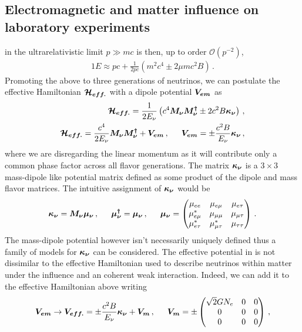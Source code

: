\subsection{Electromagnetic and matter influence on laboratory experiments}\label{rel}
\noindent{} in the ultrarelativistic limit $p\gg mc$ is then, up to order $\mathcal{O}(p^{-2})$,
\begin{alignat}{1}
	\label{eigen:3} E \approx pc + \frac{1}{2pc}\left(m^{2}c^{4}\pm2\mu mc^{2}B\right)\,.
\end{alignat}
Promoting the above to three generations of neutrinos, we can postulate the effective Hamiltonian $\boldsymbol{\mathcal{H}_{eff.}}$ with a dipole potential $\boldsymbol{V_{em}}$ as
\begin{alignat}{1}
	\label{heff:1} \bb{\mathcal{H}_{eff.}}=\frac{1}{2E_{\nu}}\left(c^{4}\bb{M_{\nu}}\bb{M_{\nu}^{\dagger}}\pm2c^{2}B\bb{\kappa_{\nu}}\right)\,,\\
	\label{heff:2} \bb{\mathcal{H}_{eff.}}=\frac{c^{4}}{2E_{\nu}}\bb{M_{\nu}}\bb{M_{\nu}^{\dagger}}+\bb{V_{em}}\,,\indent\bb{V_{em}}=\pm\frac{c^{2}B}{E_{\nu}}\bb{\kappa_{\nu}}\,,
\end{alignat}
where we are disregarding the linear momentum as it will contribute only a common phase factor across all flavor generations. \ar The matrix $\boldsymbol{\kappa_{\nu}}$ is a $3\times3$ mass-dipole like potential matrix defined as some product of the dipole and mass flavor matrices. The intuitive assignment of $\boldsymbol{\kappa_{\nu}}$ would be
\begin{alignat}{1}
	\label{kappa:1} \bb{\kappa_{\nu}} = \bb{M_\nu}\bb{\mu_{\nu}}\,,\indent\bb{\mu_{\nu}^{\dagger}}=\bb{\mu_{\nu}}\,,\indent\bb{\mu_{\nu}}=
	\begin{pmatrix}
		\mu_{ee} & \mu_{e\mu} & \mu_{e\tau} \\
		\mu_{e\mu}^{*} & \mu_{\mu\mu} & \mu_{\mu\tau} \\
		\mu_{e\tau}^{*} & \mu_{\mu\tau}^{*} & \mu_{\tau\tau}
	\end{pmatrix}\,.
\end{alignat}
The mass-dipole potential however isn't necessarily uniquely defined thus a family of models for $\boldsymbol{\kappa_{\nu}}$ can be considered. The effective potential in  is not dissimilar to the effective Hamiltonian used to describe neutrinos within matter under the influence and an coherent weak interaction. \ar Indeed, we can add it to the effective Hamiltonian above writing
\begin{alignat}{1}
	\label{matter:1} \bb{V_{em}}\rightarrow\bb{V_{eff.}}=\pm\frac{c^{2}B}{E_{\nu}}\bb{\kappa_{\nu}}+\bb{V_{m}}\,,\indent\bb{V_{m}}=\pm
	\begin{pmatrix}
		\sqrt{2}GN_{e} & 0 & 0\\
		0 & 0 & 0\\
		0 & 0 & 0
	\end{pmatrix}\,,
\end{alignat}
